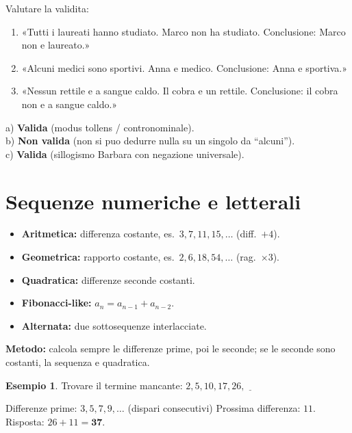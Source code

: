 \documentclass[12pt, a4paper, twoside, openright]{book}
\theoremstyle{definition}
\newtheorem{esempio}{Esempio}[section]
\begin{document}
\begin{esercizio}
Valutare la validita:
\begin{enumerate}[label=\alph*)]
  \item «Tutti i laureati hanno studiato. Marco non ha studiato. Conclusione: Marco non e laureato.»
  \item «Alcuni medici sono sportivi. Anna e medico. Conclusione: Anna e sportiva.»
  \item «Nessun rettile e a sangue caldo. Il cobra e un rettile. Conclusione: il cobra non e a sangue caldo.»
\end{enumerate}
\end{esercizio}
\begin{soluzione}
a) \textbf{Valida} (modus tollens / contronominale).\\
b) \textbf{Non valida} (non si puo dedurre nulla su un singolo da ``alcuni'').\\
c) \textbf{Valida} (sillogismo Barbara con negazione universale).
\end{soluzione}

\section{Sequenze numeriche e letterali}

\begin{attenzione}
\begin{itemize}
  \item \textbf{Aritmetica:} differenza costante, es.\ $3, 7, 11, 15, \ldots$ (diff.\ $+4$).
  \item \textbf{Geometrica:} rapporto costante, es.\ $2, 6, 18, 54, \ldots$ (rag.\ $\times 3$).
  \item \textbf{Quadratica:} differenze seconde costanti.
  \item \textbf{Fibonacci-like:} $a_n = a_{n-1} + a_{n-2}$.
  \item \textbf{Alternata:} due sottosequenze interlacciate.
\end{itemize}
\textbf{Metodo:} calcola sempre le differenze prime, poi le seconde; se le seconde sono costanti, la sequenza e quadratica.
\end{attenzione}

\begin{esempio}
Trovare il termine mancante: $2, 5, 10, 17, 26, \underline{\hspace{1em}}$

Differenze prime: $3, 5, 7, 9, \ldots$ (dispari consecutivi)
Prossima differenza: $11$. Risposta: $26 + 11 = \mathbf{37}$.
\end{esempio}
\end{document}
